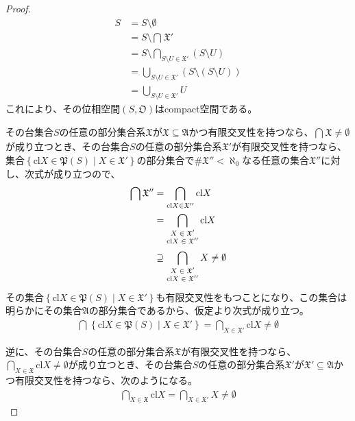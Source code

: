 \documentclass[dvipdfmx]{jsarticle}
\begin{document}
\begin{proof}
\begin{align*}
S &= S \setminus \emptyset\\
&= S \setminus \bigcap_{} \mathfrak{X}'\\
&= S \setminus \bigcap_{S \setminus U \in \mathfrak{X}'} (S \setminus U)\\
&= \bigcup_{S \setminus U \in \mathfrak{X}'} \left( S \setminus (S \setminus U) \right)\\
&= \bigcup_{S \setminus U \in \mathfrak{X}'} U
\end{align*}
これにより、その位相空間$\left( S,\mathfrak{O} \right)$はcompact空間である。\par
その台集合$S$の任意の部分集合系$\mathfrak{X}$が$\mathfrak{X \subseteq A}$かつ有限交叉性を持つなら、$\bigcap_{} \mathfrak{X} \neq \emptyset$が成り立つとき、その台集合$S$の任意の部分集合系$\mathfrak{X}'$が有限交叉性を持つなら、集合$\left\{ {\mathrm{cl}}X\in \mathfrak{P}(S) \middle| X \in \mathfrak{X}' \right\}$の部分集合で${\#}\mathfrak{X}'' < \aleph_{0}$なる任意の集合$\mathfrak{X}''$に対し、次式が成り立つので、
\begin{align*}
\bigcap_{} \mathfrak{X}'' &= \bigcap_{{\mathrm{cl}}X \in \mathfrak{X}''} {{\mathrm{cl}}X}\\
&= \bigcap_{\scriptsize \begin{matrix}
X \in \mathfrak{X}' \\
{\mathrm{cl}}X \in \mathfrak{X}'' \\
\end{matrix}} {{\mathrm{cl}}X}\\
&\supseteq \bigcap_{\scriptsize \begin{matrix}
X \in \mathfrak{X}' \\
{\mathrm{cl}}X \in \mathfrak{X}'' \\
\end{matrix}} X \neq \emptyset
\end{align*}
その集合$\left\{ {\mathrm{cl}}X\in \mathfrak{P}(S) \middle| X \in \mathfrak{X}' \right\}$も有限交叉性をもつことになり、この集合は明らかにその集合$\mathfrak{A}$の部分集合であるから、仮定より次式が成り立つ。
\begin{align*}
\bigcap_{} \left\{ {\mathrm{cl}}X\in \mathfrak{P}(S) \middle| X \in \mathfrak{X}' \right\} = \bigcap_{X \in \mathfrak{X}'} {{\mathrm{cl}}X} \neq \emptyset
\end{align*}\par
逆に、その台集合$S$の任意の部分集合系$\mathfrak{X}$が有限交叉性を持つなら、$\bigcap_{X \in \mathfrak{X}} {{\mathrm{cl}}X} \neq \emptyset$が成り立つとき、その台集合$S$の任意の部分集合系$\mathfrak{X}'$が$\mathfrak{X}'\subseteq \mathfrak{A}$かつ有限交叉性を持つなら、次のようになる。
\begin{align*}
\bigcap_{X \in \mathfrak{X}} {{\mathrm{cl}}X} = \bigcap_{X \in \mathfrak{X}'} X \neq \emptyset
\end{align*}
\end{proof}
\end{document}
